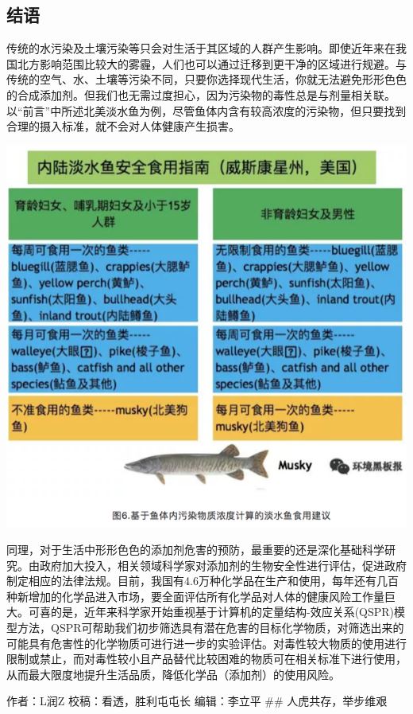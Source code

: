 \documentclass[]{book}
\begin{document}
\subsection{结语}\label{-2}

传统的水污染及土壤污染等只会对生活于其区域的人群产生影响。即使近年来在我国北方影响范围比较大的雾霾，人们也可以通过迁移到更干净的区域进行规避。与传统的空气、水、土壤等污染不同，只要你选择现代生活，你就无法避免形形色色的合成添加剂。但我们也无需过度担心，因为污染物的毒性总是与剂量相关联。以``前言''中所述北美淡水鱼为例，尽管鱼体内含有较高浓度的污染物，但只要找到合理的摄入标准，就不会对人体健康产生损害。

\includegraphics[width=8.33in]{images/epc6}

同理，对于生活中形形色色的添加剂危害的预防，最重要的还是深化基础科学研究。由政府加大投入，相关领域科学家对添加剂的生物安全性进行评估，促进政府制定相应的法律法规。目前，我国有4.6万种化学品在生产和使用，每年还有几百种新增加的化学品进入市场，要全面评估所有化学品对人体的健康风险工作量巨大。可喜的是，近年来科学家开始重视基于计算机的定量结构-效应关系(QSPR)模型方法，QSPR可帮助我们初步筛选具有潜在危害的目标化学物质，对筛选出来的可能具有危害性的化学物质可进行进一步的实验评估。对毒性较大物质的使用进行限制或禁止，而对毒性较小且产品替代比较困难的物质可在相关标准下进行使用，从而最大限度地提升生活品质，降低化学品（添加剂）的使用风险。

作者：L润Z 校稿：看透，胜利屯屯长 编辑：李立平 \#\# 人虎共存，举步维艰
\end{document}
